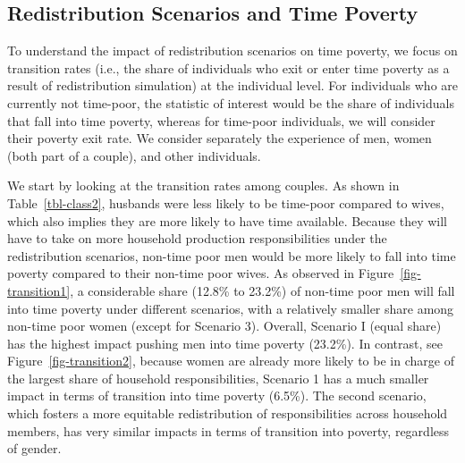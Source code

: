 \documentclass[
  11pt,
]{article}
\begin{document}
\subsection{Redistribution Scenarios and Time
Poverty}\label{redistribution-scenarios-and-time-poverty}

To understand the impact of redistribution scenarios on time poverty, we
focus on transition rates (i.e., the share of individuals who exit or
enter time poverty as a result of redistribution simulation) at the
individual level. For individuals who are currently not time-poor, the
statistic of interest would be the share of individuals that fall into
time poverty, whereas for time-poor individuals, we will consider their
poverty exit rate. We consider separately the experience of men, women
(both part of a couple), and other individuals.

We start by looking at the transition rates among couples. As shown in
Table~\ref{tbl-class2}, husbands were less likely to be time-poor
compared to wives, which also implies they are more likely to have time
available. Because they will have to take on more household production
responsibilities under the redistribution scenarios, non-time poor men
would be more likely to fall into time poverty compared to their
non-time poor wives. As observed in Figure~\ref{fig-transition1}, a
considerable share (12.8\% to 23.2\%) of non-time poor men will fall
into time poverty under different scenarios, with a relatively smaller
share among non-time poor women (except for Scenario 3). Overall,
Scenario I (equal share) has the highest impact pushing men into time
poverty (23.2\%). In contrast, see Figure~\ref{fig-transition2}, because
women are already more likely to be in charge of the largest share of
household responsibilities, Scenario 1 has a much smaller impact in
terms of transition into time poverty (6.5\%). The second scenario,
which fosters a more equitable redistribution of responsibilities across
household members, has very similar impacts in terms of transition into
poverty, regardless of gender.
\end{document}
